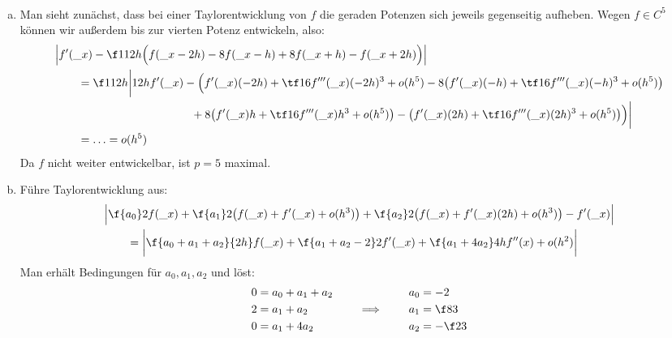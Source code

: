 \documentclass{mywork}
\begin{document}
\begin{aufgabe}~

	\begin{enumerate}[(a)]
		\item
			Man sieht zunächst, dass bei einer Taylorentwicklung von $f$ die geraden Potenzen sich jeweils gegenseitig aufheben.
			Wegen $f\in C^5$ können wir außerdem bis zur vierten Potenz entwickeln, also:
			\begin{align*}
				&\Big| f'(\_x) - \f 1{12h}\Big(f(\_x-2h) - 8f(\_x-h) + 8f(\_x+h) - f(\_x+2h)\Big)\Big| \\
				&\qquad= \f 1{12h} \bigg| 12h f'(\_x) - \Big(f'(\_x)(-2h) + \tf 16 f'''(\_x)(-2h)^3 + o(h^5) - 8\big(f'(\_x)(-h) + \tf 16 f'''(\_x)(-h)^3 + o(h^5)\big) \\
				&\qquad\qquad\qquad\qquad\qquad\qquad + 8\big(f'(\_x)h + \tf 16f'''(\_x)h^3 + o(h^5)\big) - \big(f'(\_x)(2h) + \tf 16 f'''(\_x)(2h)^3 + o(h^5)\big) \Big) \bigg| \\
				&\qquad = \dotsc = o(h^5)
			\end{align*}
			Da $f$ nicht weiter entwickelbar, ist $p=5$ maximal.
		\item
			Führe Taylorentwicklung aus:
			\begin{align*}
				&\Big| \f {a_0}2 f(\_x) + \f{a_1}2\big(f(\_x) + f'(\_x) + o(h^3)\big) + \f{a_2}2\big(f(\_x) + f'(\_x)(2h) + o(h^3)\big) - f'(\_x) \Big| \\
				&\qquad= \bigg| \f {a_0 + a_1 + a_2}{2h}f(\_x) + \f{a_1 + a_2 - 2}2 f'(\_x) + \f {a_1 + 4a_2}4 h f''(x) + o(h^2) \bigg|
			\end{align*}
			Man erhält Bedingungen für $a_0,a_1,a_2$ und löst:
			\begin{align*}
				\begin{aligned}
					0 &= a_0 + a_1 + a_2 \\
					2 &= a_1 + a_2 \\
					0 &= a_1 + 4a_2
				\end{aligned}
				\qquad\implies\qquad
				\begin{aligned}
					a_0 &= -2 \\
					a_1 &= \f 83 \\
					a_2 &= -\f 23
				\end{aligned}
			\end{align*}
	\end{enumerate}
\end{aufgabe}
\end{document}
